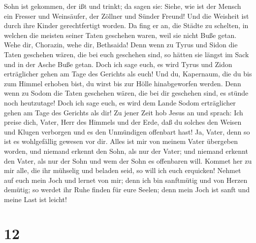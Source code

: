 Sohn ist gekommen, der ißt und trinkt; da sagen sie: Siehe, wie ist der
Mensch ein Fresser und Weinsäufer, der Zöllner und Sünder Freund! Und
die Weisheit ist durch ihre Kinder gerechtfertigt worden.
 Da fing er an, die Städte zu schelten, in welchen die
meisten seiner Taten geschehen waren, weil sie nicht Buße getan.
 Wehe dir, Chorazin, wehe dir, Bethsaida! Denn wenn zu
Tyrus und Sidon die Taten geschehen wären, die bei euch geschehen sind,
so hätten sie längst im Sack und in der Asche Buße getan.
 Doch ich sage euch, es wird Tyrus und Zidon erträglicher
gehen am Tage des Gerichts als euch!  Und du, Kapernaum,
die du bis zum Himmel erhoben bist, du wirst bis zur Hölle hinabgeworfen
werden. Denn wenn zu Sodom die Taten geschehen wären, die bei dir
geschehen sind, es stünde noch heutzutage!  Doch ich sage
euch, es wird dem Lande Sodom erträglicher gehen am Tage des Gerichts
als dir!  Zu jener Zeit hob Jesus an und sprach: Ich
preise dich, Vater, Herr des Himmels und der Erde, daß du solches den
Weisen und Klugen verborgen und es den Unmündigen offenbart hast!
 Ja, Vater, denn so ist es wohlgefällig gewesen vor dir.
 Alles ist mir von meinem Vater übergeben worden, und
niemand erkennt den Sohn, als nur der Vater; und niemand erkennt den
Vater, als nur der Sohn und wem der Sohn es offenbaren will.
 Kommet her zu mir alle, die ihr mühselig und beladen
seid, so will ich euch erquicken!  Nehmet auf euch mein
Joch und lernet von mir; denn ich bin sanftmütig und von Herzen demütig;
so werdet ihr Ruhe finden für eure Seelen;  denn mein
Joch ist sanft und meine Last ist leicht!

\hypertarget{section-11}{%
\section{12}\label{section-11}}

